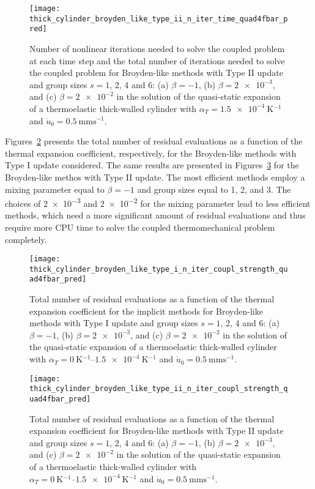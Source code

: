 \begin{figure}[htbp]
 \centering
 \texttt{[image: thick\_cylinder\_broyden\_like\_type\_ii\_n\_iter\_time\_quad4fbar\_pred]}
 \caption{Number of nonlinear iterations needed to solve the coupled problem at each time step and the total number of iterations needed to solve the coupled problem for Broyden-like methods with Type II update and group sizes \(s=1\), 2, 4 and 6: (a) \(\beta=-1\), (b) \(\beta=\num{2e-3}\), and (c) \(\beta=\num{2e-2}\) in the solution of the quasi-static expansion of a thermoelastic thick-walled cylinder with \(\alpha_T=\SI{1.5e-4}{\kelvin^{-1}}\) and \(\dot u_0 =\SI{0.5}{\milli\meter\second^{-1}}\).}
\label{fig:thick_cylinder_broyden_like_type_ii_n_iter_time_quad4fbar_pred}
\end{figure}

Figures~\ref{fig:thick_cylinder_broyden_like_type_i_n_iter_coupl_strength_quad4fbar_pred} presents the total number of residual evaluations as a function of the thermal expansion coefficient, respectively, for the Broyden-like methods with Type I update considered.
The same results are presented in Figures~\ref{fig:thick_cylinder_broyden_like_type_ii_n_iter_coupl_strength_quad4fbar_pred} for the Broyden-like methos with Type II update.
The most efficient methods employ a mixing parameter equal to \(\beta=-1\) and group sizes equal to 1, 2, and 3.
The choices of \num{2e-3} and \num{2e-2} for the mixing parameter lead to less efficient methods, which need a more significant amount of residual evaluations and thus require more CPU time to solve the coupled thermomechanical problem completely.

\begin{figure}[htbp]
 \centering
 \texttt{[image: thick\_cylinder\_broyden\_like\_type\_i\_n\_iter\_coupl\_strength\_quad4fbar\_pred]}
 \caption{Total number of residual evaluations as a function of the thermal expansion coefficient for the implicit methods for Broyden-like methods with Type I update and group sizes \(s=1\), 2, 4 and 6: (a) \(\beta=-1\), (b) \(\beta=\num{2e-3}\), and (c) \(\beta=\num{2e-2}\) in the solution of the quasi-static expansion of a thermoelastic thick-walled cylinder with \(\alpha_T=\SIrange{0}{1.5e-4}{\kelvin^{-1}}\) and \(\dot u_0 =\SI{0.5}{\milli\meter\second^{-1}}\).}
\label{fig:thick_cylinder_broyden_like_type_i_n_iter_coupl_strength_quad4fbar_pred}
\end{figure}

\begin{figure}[htbp]
 \centering
 \texttt{[image: thick\_cylinder\_broyden\_like\_type\_ii\_n\_iter\_coupl\_strength\_quad4fbar\_pred]}
 \caption{Total number of residual evaluations as a function of the thermal expansion coefficient for Broyden-like methods with Type II update and group sizes \(s=1\), 2, 4 and 6: (a) \(\beta=-1\), (b) \(\beta=\num{2e-3}\), and (c) \(\beta=\num{2e-2}\) in the solution of the quasi-static expansion of a thermoelastic thick-walled cylinder with \(\alpha_T=\SIrange{0}{1.5e-4}{\kelvin^{-1}}\) and \(\dot u_0 =\SI{0.5}{\milli\meter\second^{-1}}\).}
\label{fig:thick_cylinder_broyden_like_type_ii_n_iter_coupl_strength_quad4fbar_pred}
\end{figure}

